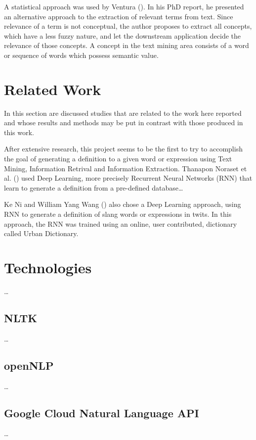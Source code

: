 A statistical approach was used by Ventura (\citeyear{ventura_2014}). 
In his PhD report, he presented an alternative approach to the extraction of relevant terms from text.
Since relevance of a term is not conceptual, the author proposes to extract all concepts, which have a less fuzzy nature, and let the downstream application decide the relevance of those concepts.
A concept in the text mining area consists of a word or sequence of words which possess semantic value.

\section{Related Work}

In this section are discussed studies that are related to the work here reported and whose results and methods may be put in contrast with those produced in this work.

After extensive research, this project seems to be the first to try to accomplish the goal of generating a definition to a given word or expression using Text Mining, Information Retrival and Information Extraction.
Thanapon Noraset et al. (\citeyear{noraset_2016}) used Deep Learning, more precisely Recurrent Neural Networks (RNN) that learn to generate a definition from a pre-defined database\dots

Ke Ni and William Yang Wang (\citeyear{ni_2017}) also chose a Deep Learning approach, using RNN to generate a definition of slang words or expressions in twits.
In this approach, the RNN was trained using an online, user contributed, dictionary called Urban Dictionary.

\section{Technologies}

\dots

\subsection{NLTK}

\dots

\subsection{openNLP}

\dots

\subsection{Google Cloud Natural Language API}

\dots

